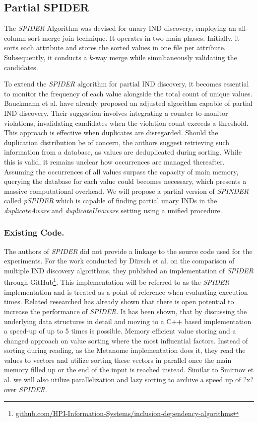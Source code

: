 \subsection{Partial SPIDER}
The \textit{SPIDER} Algorithm \cite{bauckmann2006efficiently} was devised for unary IND discovery, employing an all-column sort merge join technique. It operates in two main phases. Initially, it sorts each attribute and stores the sorted values in one file per attribute. Subsequently, it conducts a $k$-way merge while simultaneously validating the candidates.

To extend the \textit{SPIDER} algorithm for partial IND discovery, it becomes essential to monitor the frequency of each value alongside the total count of unique values. Bauckmann et al. have already proposed an adjusted algorithm capable of partial IND discovery. Their suggestion involves integrating a counter to monitor violations, invalidating candidates when the violation count exceeds a threshold. This approach is effective when duplicates are disregarded. Should the duplication distribution be of concern, the authors suggest retrieving such information from a database, as values are deduplicated during sorting. While this is valid, it remains unclear how occurrences are managed thereafter. Assuming the occurrences of all values surpass the capacity of main memory, querying the database for each value could becomes necessary, which presents a massive computational overhead. We will propose a partial version of \textit{SPINDER} called \textit{pSPIDER} which is capable of finding partial unary INDs in the \textit{duplicateAware} and \textit{duplicateUnaware} setting using a unified procedure.

\subsubsection{\textbf{Existing Code.}}
The authors of \textit{SPIDER} did not provide a linkage to the source code used for the experiments. For the work conducted by Dürsch et al. on the comparison of multiple IND discovery algorithms\cite{dursch2019inclusion}, they published an implementation of \textit{SPIDER} through GitHub\footnote{\href{https://github.com/HPI-Information-Systems/inclusion-dependency-algorithms}{github.com/HPI-Information-Systems/inclusion-dependency-algorithms}}. This implementation will be referred to as the \textit{SPIDER} implementation and is treated as a point of reference when evaluating execution times. Related researched has already shown that there is open potential to increase the performance of \textit{SPIDER}. It has been shown, that by discussing the underlying data structures in detail and moving to a C++ based implementation \cite{smirnov2023fast} a speed-up of up to 5 times is possible. Memory efficient value storing and a changed approach on value sorting where the most influential factors. Instead of sorting during reading, as the Metanome implementation does it, they read the values to vectors and utilize sorting these vectors in parallel once the main memory filled up or the end of the input is reached instead. Similar to Smirnov et al. we will also utilize parallelization and lazy sorting to archive a speed up of ?x? over \textit{SPIDER}.

